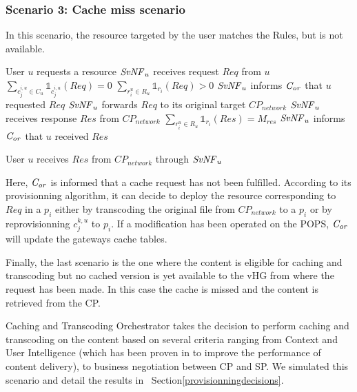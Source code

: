 \subsubsection*{Scenario 3: Cache miss scenario}

In this scenario, the resource targeted by the user matches the Rules, but is not available.

\begin{algorithmic}[1]
\STATE User $u$ requests a resource
\STATE $\mathit{SvNF}_{u}$ receives request $\mathit{Req}$ from $u$
\STATE \( \sum_{c^{i,u}_{j}\in C_{u}}{\mathbb{1}_{c^{i,u}_{j}}(\mathit{Req})} = 0 \)
\STATE \( \sum_{r^{u}_{i}\in R_{u}}{\mathbb{1}_{r_{i}}(\mathit{Req})} > 0  \)
\STATE $\mathit{SvNF}_{u}$ informs $\mathit{C_{or}}$ that $u$ requested $\mathit{Req}$
\ENDIF
\STATE $\mathit{SvNF}_{u}$ forwards $\mathit{Req}$ to its original target \(\mathit{CP}_{\mathit{network}}\)
\STATE $\mathit{SvNF}_{u}$ receives response $\mathit{Res}$ from \(\mathit{CP}_{\mathit{network}}\)
	\STATE \( \sum_{r^{u}_{i}\in R_{u}}{\mathbb{1}_{r_{i}}(\mathit{Res})}=M_{res}\) 
	\STATE $\mathit{SvNF}_{u}$ informs $\mathit{C_{or}}$ that $u$ received $\mathit{Res}$
	\ENDIF
\ENDIF

 
\STATE User $u$ receives $\mathit{Res}$ from \(\mathit{CP}_{\mathit{network}}\) through $\mathit{SvNF}_{u}$
\end{algorithmic}

Here, $\mathit{C_{or}}$ is informed that a cache request has not been fulfilled. According to its provisionning algorithm, it can decide to deploy the resource corresponding to $\mathit{Req}$ in a $p_{i}$ either by transcoding the original file from \(\mathit{CP}_{\mathit{network}}\) to a $p_{i}$ or by reprovisionning $c^{k,u}_{j}$ to $p_{i}$.
If a modification has been operated on the POPS, $\mathit{C_{or}}$ will update the gateways cache tables.

Finally, the last scenario is the one where the content is eligible for caching and transcoding but no cached version is yet available to the vHG from where the request has been made.
In this case the cache is missed and the content is retrieved from the CP.

Caching and Transcoding Orchestrator takes the decision to perform caching and transcoding on the content based on several criteria ranging from Context and User Intelligence (which has been proven in \cite{wang_cpcdn:_2015} to improve the performance of content delivery), to business negotiation between CP and SP.
We simulated this scenario and detail the results in ~Section\ref{provisionningdecisions}.

